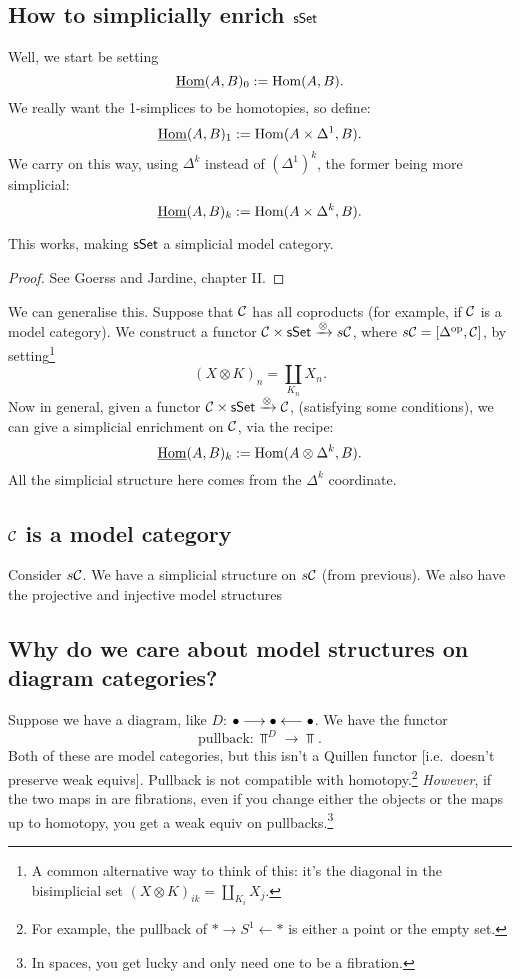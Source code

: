\begin{InnaSimplicalModelCats}
\subsection*{How to simplicially enrich $\operatorname{{\mathsf{sSet}}}$}
Well, we start be setting 
\[\underline{\operatorname{Hom}}(A,B)_0:=\operatorname{Hom}(A,B).\]
We really want the 1-simplices to be homotopies, so define:
\[\underline{\operatorname{Hom}}(A,B)_1:=\operatorname{Hom}(A\times\Delta^1,B).\]
We carry on this way, using $\Delta^k$ instead of $(\Delta^1)^k$, the former being more simplicial:
\[\underline{\operatorname{Hom}}(A,B)_k:=\operatorname{Hom}(A\times\Delta^k,B).\]
\begin{thm*}[Quillen?]
This works, making $\operatorname{{\mathsf{sSet}}}$ a simplicial model category.
\end{thm*}
\begin{proof} See Goerss and Jardine, chapter II.
\end{proof}
We can generalise this. Suppose that $\mathcal{C}$ has all coproducts (for example, if $\mathcal{C}$ is a model category). We construct a functor $\mathcal{C}\times\operatorname{{\mathsf{sSet}}}\xrightarrow{\otimes}s\mathcal{C}$, where $s\mathcal{C}=[\Delta^{\textup{op}},\mathcal{C}]$, by setting\footnote{A common alternative way to think of this: it's the diagonal in the bisimplicial set $(X\otimes K)_{ik}=\coprod_{K_i}X_j$.} 
\[(X\otimes K)_n=\coprod_{K_n}X_n.\]
Now in general, given a functor $\mathcal{C}\times\operatorname{{\mathsf{sSet}}}\xrightarrow{\otimes}\mathcal{C}$, (satisfying some conditions), we can give a simplicial enrichment on $\mathcal{C}$, via the recipe:
\[\underline{\operatorname{Hom}}(A,B)_k:=\operatorname{Hom}(A\otimes\Delta^k,B).\]
All the simplicial structure here comes from the $\Delta^k$ coordinate.

\subsection*{$\mathcal{C}$ is a model category}
Consider $s\mathcal{C}$. We have a simplicial structure on $s\mathcal{C}$ (from previous). We also have the projective and injective model structures
\subsection*{Why do we care about model structures on diagram categories?}
Suppose we have a diagram, like $D$: $\bullet\longrightarrow\bullet\longleftarrow\bullet$.  We have the functor
\[\text{pullback}:\Top^D\to\Top.\]
Both of these are model categories, but this isn't a Quillen functor [i.e.\ doesn't preserve weak equivs]. Pullback is not compatible with homotopy.\footnote{For example, the pullback of $\ast\longrightarrow S^1\longleftarrow\ast$ is either a point or the empty set.} \emph{However}, if the two maps in are fibrations, even if you change either the objects or the maps up to homotopy, you get a weak equiv on pullbacks.\footnote{In spaces, you get lucky and only need one to be a fibration.}


\end{InnaSimplicalModelCats}
